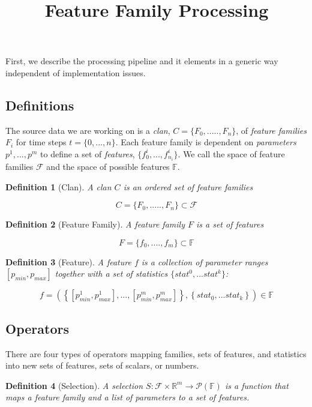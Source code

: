 \documentclass[journal]{vgtc}         %
\title{Feature Family Processing}
\def\Rspace{\mathbb{R}} %
\def\Fspace{\mathbb{F}} %
\def\Cspace{\mathcal{F}} %
\def\Pset{\mathcal{P}} %
\newtheorem{definition}{Definition}
\begin{document}
\maketitle

First, we describe the processing pipeline and it elements in a generic way
independent of implementation issues.

\subsection{Definitions}

The source data we are working on is a {\it clan}, $C=\{F_0,....., F_n\}$, of
{\it feature families} $F_i$ for time steps $t=\{0,...,n\}$. Each feature family
is dependent on {\it parameters} $p^1,...,p^m$ to define a set of {\it
  features}, $\{f_0^i,...,f_{n_i}^i\}$. We call the space of feature families
$\Cspace$ and the space of possible features $\Fspace$.

\begin{definition}[Clan]
  A \emph{clan} $C$ is an ordered set of feature families
  
  $$C = \{F_0,....., F_n\} \subset \Cspace$$
\end{definition}

\begin{definition}[Feature Family]
  A \emph{feature family} $F$ is a set of features 

  $$F = \{f_0,....,f_m\} \subset \Fspace$$

\end{definition}

\begin{definition}[Feature]
  A \emph{feature} $f$ is a collection of parameter ranges $[p_{min},p_{max}]$
  together with a set of statistics $\{stat^0,...stat^k\}$:

  $$f =
 \left(\left\{[p_{min}^1,p_{max}^1],...,[p_{min}^m,p_{max}^m]\right\},\left\{stat_0,...stat_k\right\}\right)
 \in \Fspace$$
\end{definition}


\subsection{Operators}

There are four types of operators mapping families, sets of features, and
statistics into new sets of features, sets of scalars, or numbers.

\begin{definition}[Selection]
  
  A \emph{selection} $S: \Cspace \times \Rspace^m \rightarrow \Pset(\Fspace)$
  is a function that maps a feature family and a list of parameters to a set of
  features. 

\end{definition}
\end{document}
